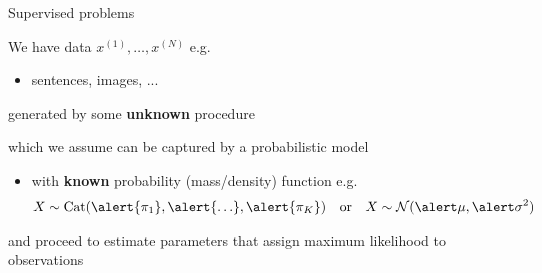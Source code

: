 \documentclass[14pt]{beamer}
\begin{document}
\begin{frame}{Supervised problems}

\small

We have data $x^{(1)}, \ldots, x^{(N)}$ e.g.  \\
\begin{itemize}
	\item sentences, images, ...
\end{itemize}
generated by some {\bf unknown} procedure

\pause

which we assume can be captured by a probabilistic model



\begin{itemize}
	\item with {\bf known} probability (mass/density) function e.g.
	\begin{align*}
    X \sim \Cat(\alert{\pi_1}, \alert{\ldots}, \alert{\pi_K}) & & \text{or} & & X \sim \mathcal N(\alert\mu, \alert\sigma^2)
    \end{align*}    
\end{itemize}
\pause
and proceed to \alert{estimate parameters} that assign maximum likelihood to observations

\end{frame}
\end{document}

